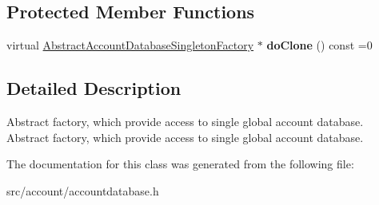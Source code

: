 \subsection*{Protected Member Functions}
\begin{DoxyCompactItemize}
\item 
\mbox{\label{classAbstractAccountDatabaseSingletonFactory_a12bb4c8056a319fab670c1ea0508624a}} 
virtual \hyperlink{classAbstractAccountDatabaseSingletonFactory}{Abstract\+Account\+Database\+Singleton\+Factory} $\ast$ {\bfseries do\+Clone} () const =0
\end{DoxyCompactItemize}


\subsection{Detailed Description}
Abstract factory, which provide access to single global account database.  Abstract factory, which provide access to single global account database. 

The documentation for this class was generated from the following file\+:\begin{DoxyCompactItemize}
\item 
src/account/accountdatabase.\+h\end{DoxyCompactItemize}

